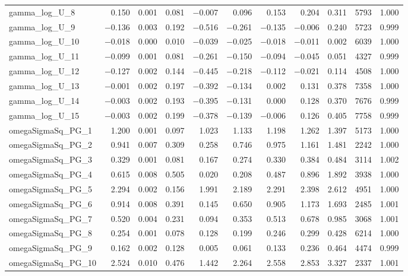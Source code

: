 \documentclass[12pt]{article}
\begin{document}
\begin{longtable}{lrrrrrrrrrr}
gamma\_log\_U\_8  &  0.150 & 0.001 & 0.081 & $-$0.007 &  0.096 &  0.153 &  0.204 &  0.311 & 5793 & 1.000 \\
gamma\_log\_U\_9  & $-$0.136 & 0.003 & 0.192 & $-$0.516 & $-$0.261 & $-$0.135 & $-$0.006 &  0.240 & 5723 & 0.999 \\
gamma\_log\_U\_10 & $-$0.018 & 0.000 & 0.010 & $-$0.039 & $-$0.025 & $-$0.018 & $-$0.011 &  0.002 & 6039 & 1.000 \\
gamma\_log\_U\_11 & $-$0.099 & 0.001 & 0.081 & $-$0.261 & $-$0.150 & $-$0.094 & $-$0.045 &  0.051 & 4327 & 0.999 \\
gamma\_log\_U\_12 & $-$0.127 & 0.002 & 0.144 & $-$0.445 & $-$0.218 & $-$0.112 & $-$0.021 &  0.114 & 4508 & 1.000 \\
gamma\_log\_U\_13 & $-$0.001 & 0.002 & 0.197 & $-$0.392 & $-$0.134 &  0.002 &  0.131 &  0.378 & 7358 & 1.000 \\
gamma\_log\_U\_14 & $-$0.003 & 0.002 & 0.193 & $-$0.395 & $-$0.131 &  0.000 &  0.128 &  0.370 & 7676 & 0.999 \\
gamma\_log\_U\_15 & $-$0.003 & 0.002 & 0.199 & $-$0.378 & $-$0.139 & $-$0.006 &  0.126 &  0.405 & 7758 & 0.999 \\
\addlinespace
omegaSigmaSq\_PG\_1  & 1.200 & 0.001 & 0.097 & 1.023 & 1.133 & 1.198 & 1.262 & 1.397 & 5173 & 1.000 \\
omegaSigmaSq\_PG\_2  & 0.941 & 0.007 & 0.309 & 0.258 & 0.746 & 0.975 & 1.161 & 1.481 & 2242 & 1.000 \\
omegaSigmaSq\_PG\_3  & 0.329 & 0.001 & 0.081 & 0.167 & 0.274 & 0.330 & 0.384 & 0.484 & 3114 & 1.002 \\
omegaSigmaSq\_PG\_4  & 0.615 & 0.008 & 0.505 & 0.020 & 0.208 & 0.487 & 0.896 & 1.892 & 3938 & 1.000 \\
omegaSigmaSq\_PG\_5  & 2.294 & 0.002 & 0.156 & 1.991 & 2.189 & 2.291 & 2.398 & 2.612 & 4951 & 1.000 \\
omegaSigmaSq\_PG\_6  & 0.914 & 0.008 & 0.391 & 0.145 & 0.650 & 0.905 & 1.173 & 1.693 & 2485 & 1.001 \\
omegaSigmaSq\_PG\_7  & 0.520 & 0.004 & 0.231 & 0.094 & 0.353 & 0.513 & 0.678 & 0.985 & 3068 & 1.001 \\
omegaSigmaSq\_PG\_8  & 0.254 & 0.001 & 0.078 & 0.128 & 0.199 & 0.246 & 0.299 & 0.428 & 6214 & 1.000 \\
omegaSigmaSq\_PG\_9  & 0.162 & 0.002 & 0.128 & 0.005 & 0.061 & 0.133 & 0.236 & 0.464 & 4474 & 0.999 \\
omegaSigmaSq\_PG\_10 & 2.524 & 0.010 & 0.476 & 1.442 & 2.264 & 2.558 & 2.853 & 3.327 & 2337 & 1.001 \\

\end{longtable}
\end{document}
